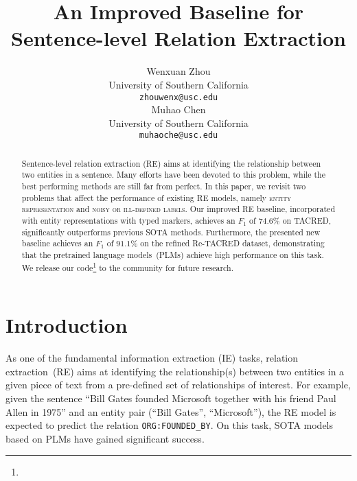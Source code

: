 \documentclass[11pt,a4paper]{article}
\title{An Improved Baseline for Sentence-level Relation Extraction}
\author{Wenxuan Zhou \\
  University of Southern California \\
  \texttt{zhouwenx@usc.edu} \\\And
  Muhao Chen \\
  University of Southern California \\
  \texttt{muhaoche@usc.edu} \\}
\date{}
\begin{document}
\maketitle

\begin{abstract}
Sentence-level relation extraction (RE) aims at identifying the relationship between two entities in a sentence.
Many efforts have been devoted to this problem, while the best performing methods are still far from perfect.
In this paper, we revisit two problems that affect the performance of existing RE models, namely \textsc{entity representation} and \textsc{noisy or ill-defined labels}.
Our improved RE baseline, incorporated with entity representations with typed markers, achieves an $F_1$ of $74.6\%$ on TACRED, significantly outperforms previous SOTA methods.
Furthermore, the presented new baseline achieves an $F_1$ of $91.1\%$ on the refined Re-TACRED dataset, demonstrating that the pretrained language models~(PLMs) achieve high performance on this task.
We release our code\footnote{} to the community for future research.


\end{abstract}

\section{Introduction}

As one of the fundamental information extraction (IE) tasks,
relation extraction~(RE) aims at identifying the relationship(s) between two entities in a given piece of text from a pre-defined set of relationships of interest.
For example, given the sentence ``Bill Gates founded Microsoft together with his friend Paul Allen in 1975'' and an entity pair (``Bill Gates'', ``Microsoft''), the RE model is expected to predict the relation \texttt{ORG:FOUNDED\_BY}.
On this task, SOTA models based on PLMs \cite{devlin-etal-2019-bert,joshi-etal-2020-spanbert} have gained significant success.
\end{document}
